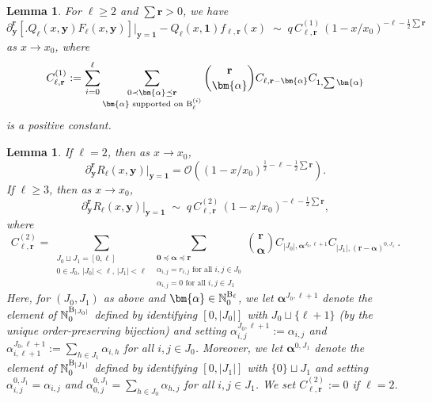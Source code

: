 \documentclass{article}
\newtheorem{lemma}[theorem]{Lemma}
\theoremstyle{remark}
\newcommand{\bN}{\mathbb{N}}
\newcommand{\cO}{\mathcal{O}}
\newcommand{\abs}[1]{{\left|#1\right|}}
\newcommand{\pairs}{{\rm B}}
\newcommand{\by}{{\mathbf{y}}}
\newcommand{\br}{{\mathbf{r}}}
\begin{document}
\begin{lemma}\label{lem: asymptotics first term Rellr tilde}
    For $\ell\ge2$ and $\sum\br > 0$, we have
    \begin{equation*}
        \partial_\by^\br {\left[\big. Q_\ell(x,\by) F_\ell(x,\by) \right]}\vert_{\by=\bm{1}}
        - Q_\ell(x,\bm{1}) f_{\ell,\br}(x)
        \;\sim\;
        q\, C_{\ell,\br}^{(1)}\,
        (1-x/x_0)^{-\ell - \frac12\sum\br}
    \end{equation*}
    as $x\to x_0$, where
    \begin{equation*}
        C_{\ell,\br}^{(1)} := \sum_{i=0}^\ell \sum_{\substack{0\prec \bm{\alpha}\preceq \br \\ \bm{\alpha} \text{ supported on } \pairs_\ell^{(i)}}} 
        \binom{\br}{\bm{\alpha}}
        C_{\ell, \br-\bm{\alpha}} C_{1,\sum\bm{\alpha}} 
    \end{equation*}
    is a positive constant.
\end{lemma}

\begin{lemma}\label{lem: asymptotics second term Rellr tilde}
    If $\ell=2$, then as $x\to x_0$,
    \begin{equation*}
        \partial_\by^\br R_\ell(x,\by) \vert_{\by=\bm{1}}
        = \cO\left( (1-x/x_0)^{\frac12-\ell-\frac12\sum\br} \right).
    \end{equation*}
    If $\ell\ge3$, then as $x\to x_0$,
    \begin{equation*}
        \partial_\by^\br R_\ell(x,\by) \vert_{\by=\bm{1}}
        \;\sim\;
        q\, C_{\ell,\br}^{(2)}\,
        (1-x/x_0)^{-\ell-\frac12\sum\br},
    \end{equation*}
    where
    \begin{equation*}
        C_{\ell,\br}^{(2)} 
        = \sum_{\substack{ J_0 \sqcup J_1 = [0,\ell] \\ 0\in J_0,\, \abs{J_0}<\ell,\, \abs{J_1}<\ell }}
        \sum_{\substack{ \bm{0}\preceq \bm{\alpha}\preceq \br \\ \alpha_{i,j}=r_{i,j} \text{ for all } i,j\in J_0 \\  \alpha_{i,j}=0 \text{ for all } i,j\in J_1 }}
        \binom{\br}{\bm{\alpha}}
        C_{\abs{J_0}, \bm\alpha^{J_0,\ell+1}}
        C_{\abs{J_1}, (\br-\bm\alpha)^{0,J_1}} \,.
    \end{equation*}
    Here, for $(J_0,J_1)$ as above and $\bm{\alpha} \in \bN_0^{\pairs_\ell}$, we let $\bm{\alpha}^{J_0,\ell+1}$ denote the element of $\bN_0^{\pairs_{\abs{J_0}}}$ defined by identifying $[0,\abs{J_0}]$ with $J_0 \sqcup \{\ell+1\}$ (by the unique order-preserving bijection) and setting $\alpha^{J_0,\ell+1}_{i,j} := \alpha_{i,j}$ and $\alpha^{J_0,\ell+1}_{i,\ell+1} := \sum_{h\in J_1} \alpha_{i,h}$ for all $i,j\in J_0$.
    Moreover, we let $\bm{\alpha}^{0,J_1}$ denote the element of $\bN_0^{\pairs_{\abs{J_1}}}$ defined by identifying $[0,\abs{J_1}]$ with $\{0\} \sqcup J_1$ and setting $\alpha^{0,J_1}_{i,j} = \alpha_{i,j}$ and $\alpha^{0,J_1}_{0,j} = \sum_{h\in J_0} \alpha_{h,j}$ for all $i,j\in J_1$.
    We set $C_{\ell,\br}^{(2)} := 0$ if $\ell=2$.
\end{lemma}
\end{document}
